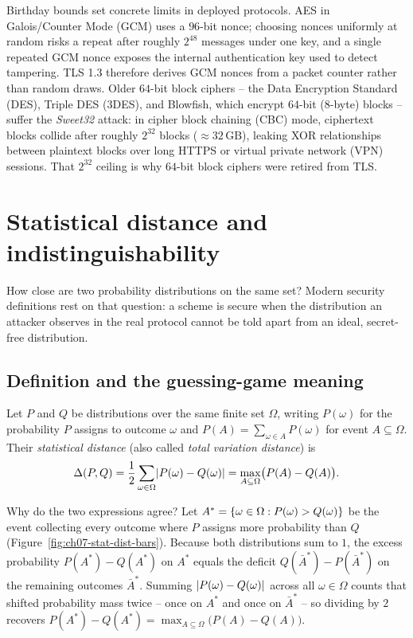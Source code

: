 \begin{applicationbox}
Birthday bounds set concrete limits in deployed protocols. AES in Galois/Counter Mode (GCM) uses a $96$-bit nonce; choosing nonces uniformly at random risks a repeat after roughly $2^{48}$ messages under one key, and a single repeated GCM nonce exposes the internal authentication key used to detect tampering. TLS 1.3 therefore derives GCM nonces from a packet counter rather than random draws. Older $64$-bit block ciphers -- the Data Encryption Standard (DES), Triple DES (3DES), and Blowfish, which encrypt $64$-bit ($8$-byte) blocks -- suffer the \emph{Sweet32} attack: in cipher block chaining (CBC) mode, ciphertext blocks collide after roughly $2^{32}$ blocks ($\approx 32\,\text{GB}$), leaking XOR relationships between plaintext blocks over long HTTPS or virtual private network (VPN) sessions. That $2^{32}$ ceiling is why $64$-bit block ciphers were retired from TLS.
\end{applicationbox}

\section{Statistical distance and indistinguishability}

How close are two probability distributions on the same set? Modern security definitions rest on that question: a scheme is secure when the distribution an attacker observes in the real protocol cannot be told apart from an ideal, secret-free distribution.

\subsection{Definition and the guessing-game meaning}

\begin{definition}
\label{ch07:stat-distance}
Let $P$ and $Q$ be distributions over the same finite set $\Omega$, writing $P(\omega)$ for the probability $P$ assigns to outcome $\omega$ and $P(A) = \sum_{\omega \in A} P(\omega)$ for event $A \subseteq \Omega$. Their \emph{statistical distance} (also called \emph{total variation distance}) is
\[
  \Delta(P, Q) = \frac{1}{2}\sum_{\omega \in \Omega} \lvert P(\omega) - Q(\omega)\rvert = \max_{A \subseteq \Omega} \bigl( P(A) - Q(A) \bigr).
\]
\end{definition}

Why do the two expressions agree? Let $A^* = \{\omega \in \Omega : P(\omega) > Q(\omega)\}$ be the event collecting every outcome where $P$ assigns more probability than $Q$ (Figure~\ref{fig:ch07-stat-dist-bars}). Because both distributions sum to $1$, the excess probability $P(A^*) - Q(A^*)$ on $A^*$ equals the deficit $Q(\bar A^*) - P(\bar A^*)$ on the remaining outcomes $\bar A^*$. Summing $\lvert P(\omega) - Q(\omega)\rvert$ across all $\omega \in \Omega$ counts that shifted probability mass twice -- once on $A^*$ and once on $\bar A^*$ -- so dividing by $2$ recovers $P(A^*) - Q(A^*) = \max_{A \subseteq \Omega}\bigl(P(A) - Q(A)\bigr)$.

